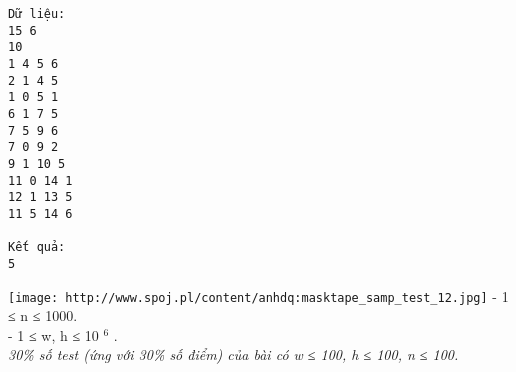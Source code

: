 \begin{verbatim}
Dữ liệu:
15 6
10
1 4 5 6
2 1 4 5
1 0 5 1
6 1 7 5
7 5 9 6
7 0 9 2
9 1 10 5
11 0 14 1
12 1 13 5
11 5 14 6

Kết quả:
5
\end{verbatim}
\texttt{[image: http://www.spoj.pl/content/anhdq:masktape\_samp\_test\_12.jpg]}
- 1 ≤ n ≤ 1000.   
\\   - 1 ≤ w, h ≤ 10   $^    6   $   .   
\\\textit{     30\% số test (ứng với 30\% số điểm) của bài có  w ≤ 100, h ≤ 100, n ≤ 100.    }